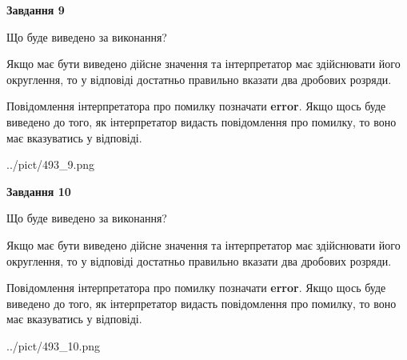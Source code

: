 \documentclass[12pt, ukrainian]{article}
\begin{document}
{\begin {Large}
{\begin {center}\textbf{Завдання 9}\end {center}}\par
Що буде виведено за виконання? \par

Якщо має бути виведено дійсне значення та інтерпретатор має здійснювати його округлення, 
то у відповіді достатньо правильно вказати два дробових розряди.

Повідомлення інтерпретатора про помилку позначати \textbf{error}.
Якщо щось буде виведено до того, як інтерпретатор видасть повідомлення про помилку, 
то воно має вказуватись у відповіді. \par

\begin{center}
	{../pict/493_9.png}
\end{center}
\newpage

{\begin {center}\textbf{Завдання 10}\end {center}}\par
Що буде виведено за виконання? \par

Якщо має бути виведено дійсне значення та інтерпретатор має здійснювати його округлення, 
то у відповіді достатньо правильно вказати два дробових розряди.

Повідомлення інтерпретатора про помилку позначати \textbf{error}.
Якщо щось буде виведено до того, як інтерпретатор видасть повідомлення про помилку, 
то воно має вказуватись у відповіді. \par

\begin{center}
	{../pict/493_10.png}
\end{center}
\newpage

\end {Large}}
\end{document}

